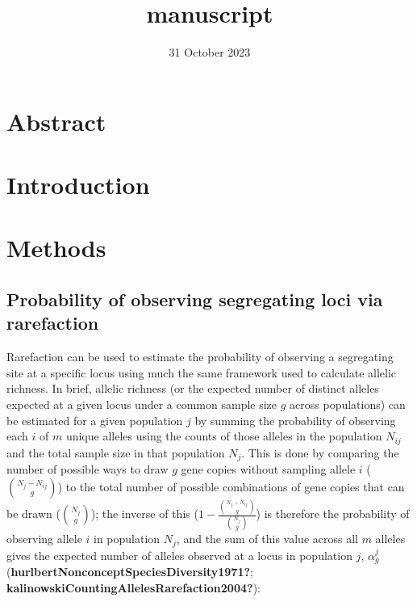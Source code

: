 \documentclass[
  12pt,
]{article}
\title{manuscript}
\author{}
\date{\vspace{-2.5em}31 October 2023}
\begin{document}
\maketitle

\hypertarget{abstract}{%
\section{Abstract}\label{abstract}}

\hypertarget{introduction}{%
\section{Introduction}\label{introduction}}

\hypertarget{methods}{%
\section{Methods}\label{methods}}

\hypertarget{probability-of-observing-segregating-loci-via-rarefaction}{%
\subsection{Probability of observing segregating loci via
rarefaction}\label{probability-of-observing-segregating-loci-via-rarefaction}}

Rarefaction can be used to estimate the probability of observing a
segregating site at a specific locus using much the same framework used
to calculate allelic richness. In brief, allelic richness (or the
expected number of distinct alleles expected at a given locus under a
common sample size \(g\) across populations) can be estimated for a
given population \(j\) by summing the probability of observing each
\(i\) of \(m\) unique alleles using the counts of those alleles in the
population \(N_{ij}\) and the total sample size in that population
\(N_{j}\). This is done by comparing the number of possible ways to draw
\(g\) gene copies without sampling allele \(i\)
(\(\binom{N_{j} - N_{ij}}{g}\)) to the total number of possible
combinations of gene copies that can be drawn (\(\binom{N_{j}}{g}\));
the inverse of this
(\(1 - \frac{\binom{N_{j} - N_{ij}}{g}}{\binom{N_{j}}{g}}\)) is
therefore the probability of observing allele \(i\) in population
\(N_{j}\), and the sum of this value across all \(m\) alleles gives the
expected number of alleles observed at a locus in population \(j\),
\(\alpha_{g}^{j}\) (\textbf{hurlbertNonconceptSpeciesDiversity1971?};
\textbf{kalinowskiCountingAllelesRarefaction2004?}):
\end{document}
